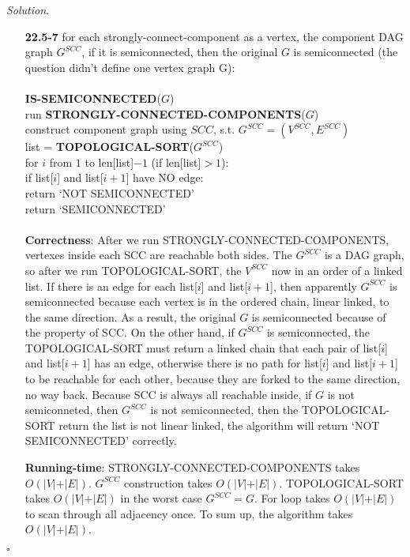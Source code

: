 \documentclass[11pt]{article}
\theoremstyle{definition}
\newenvironment{solution}{\noindent\emph{Solution.}}{\hfill$\square$}
\newcommand\tab[1][1cm]{\hspace*{#1}}
\begin{document}
\begin{solution}
\begin{enumerate}
 \item[\textbf{22.5-7}] \tab for each strongly-connect-component as a vertex, the component DAG graph $G^{SCC}$, if it is semiconnected, then the original $G$ is semiconnected (the question didn't define one vertex graph G):\\ \\
 \textbf{IS-SEMICONNECTED}($G$)\\
 run \textbf{STRONGLY-CONNECTED-COMPONENTS}($G$)\\
 construct component graph using $SCC$, s.t. $G^{SCC} = (V^{SCC}, E^{SCC})$\\
 list = \textbf{TOPOLOGICAL-SORT}($G^{SCC}$)\\
 for $i$ from $1$ to len[list]$-1$ (if len[list]$ > 1$):\\
 \tab if list[$i$] and list[$i+1$] have NO edge:\\
 \tab \tab return `NOT SEMICONNECTED'\\
 return `SEMICONNECTED'\\
\\
\tab \textbf{Correctness}: After we run STRONGLY-CONNECTED-COMPONENTS, vertexes inside each SCC are reachable both sides. The $G^{SCC}$ is a DAG graph, so after we run TOPOLOGICAL-SORT, the $V^{SCC}$ now in an order of a linked list. If there is an edge for each list[$i$] and list[$i+1$], then apparently $G^{SCC}$ is semiconnected because each vertex is in the ordered chain, linear linked, to the same direction. As a result, the original $G$ is semiconnected because of the property of SCC. On the other hand, if $G^{SCC}$ is semiconnected, the TOPOLOGICAL-SORT must return a linked chain that each pair of list[$i$] and list[$i+1$] has an edge, otherwise there is no path for list[$i$] and list[$i+1$] to be reachable for each other, because they are forked to the same direction, no way back. Because SCC is always all reachable inside, if $G$ is not semiconneted, then $G^{SCC}$ is not semiconnected, then the TOPOLOGICAL-SORT return the list is not linear linked, the algorithm will return `NOT SEMICONNECTED' correctly.

\tab \textbf{Running-time}: STRONGLY-CONNECTED-COMPONENTS takes $O(\vert V \vert + \vert E \vert)$. $G^{SCC}$ construction takes $O(\vert V \vert + \vert E \vert)$. TOPOLOGICAL-SORT takes $O(\vert V \vert + \vert E \vert)$ in the worst case $G^{SCC} = G$. For loop takes $O(\vert V \vert + \vert E \vert)$ to scan through all adjacency once. To sum up, the algorithm takes $O(\vert V \vert + \vert E \vert)$.
    
\end{enumerate}


\end{solution}
\end{document}
